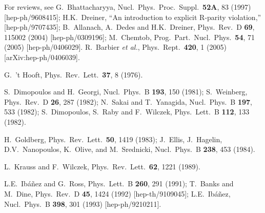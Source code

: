 \documentclass[11pt]{article}
\def\perspectives{in {\it Perspectives on Supersymmetry}, ed.
G.L.~Kane (World Scientific, 1998)}
\begin{document}
\begin{thebibliography}{999}
For reviews, see
G.~Bhattacharyya,
  Nucl.\ Phys.\ Proc.\ Suppl.\  {\bf 52A}, 83 (1997)
  [hep-ph/9608415];
H.K.~Dreiner,
  ``An introduction to explicit R-parity violation,''
  [hep-ph/9707435];
B.~Allanach, A.~Dedes and H.K.~Dreiner,
  Phys.\ Rev.\ D {\bf 69}, 115002 (2004)
  [hep-ph/0309196];
M.~Chemtob,
  Prog.\ Part.\ Nucl.\ Phys.\  {\bf 54}, 71 (2005)
  [hep-ph/0406029].
R.~Barbier {\it et al.},
  Phys.\ Rept.\  {\bf 420}, 1 (2005)
  [arXiv:hep-ph/0406039].

G.~'t Hooft,
  Phys.\ Rev.\ Lett.\  {\bf 37}, 8 (1976).

S.~Dimopoulos and H.~Georgi,
  Nucl.\ Phys.\ B {\bf 193}, 150 (1981);
S.~Weinberg, 
  Phys.\ Rev.\ D {\bf 26}, 287 (1982);
N.~Sakai and T.~Yanagida, 
  Nucl.\ Phys.\ B {\bf 197}, 533 (1982);
S.~Dimopoulos, S.~Raby and F.~Wilczek, 
  Phys.\ Lett.\ B {\bf 112}, 133 (1982).

H.~Goldberg, 
  Phys.\ Rev.\ Lett.\  {\bf 50}, 1419 (1983);
J.~Ellis, J.~Hagelin, D.V.~Nanopoulos, K.~Olive, and M.~Srednicki,
  Nucl.\ Phys.\ B {\bf 238}, 453 (1984).

L.~Krauss and F.~Wilczek, 
  Phys.\ Rev.\ Lett.\  {\bf 62}, 1221 (1989).

L.E.~Ib\'a\~nez and G.~Ross,
  Phys.\ Lett.\ B {\bf 260}, 291 (1991);
T.~Banks and M.~Dine, 
  Phys.\ Rev.\ D {\bf 45}, 1424 (1992)
  [hep-th/9109045];
L.E.~Ib\'a\~nez, 
  Nucl.\ Phys.\ B {\bf 398}, 301 (1993)
  [hep-ph/9210211].


\end{thebibliography}
\end{document}
